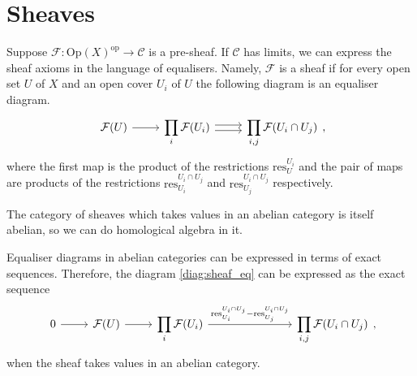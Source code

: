 \section{Sheaves}
\begin{cat}
  Suppose $\mathcal{F}: \text{Op}(X)^{\text{op}}\to\mathcal{C}$ is a pre-sheaf.
  If $\mathcal{C}$ has limits, we can express the sheaf axioms in the
  language of equalisers. Namely, $\mathcal{F}$ is a sheaf if for every
  open set $U$ of $X$ and an open cover $U_{i}$ of $U$ the following
  diagram is an equaliser diagram.
  \begin{equation}\label{diag:sheaf_eq}\begin{tikzcd}
      \mathcal{F}(U)\rar
      & \displaystyle\prod_{i}\mathcal{F}(U_{i})\rar[shift left]\rar[shift right]
      & \displaystyle\prod_{i,j}\mathcal{F}(U_{i}\cap U_{j})
    \end{tikzcd},\end{equation}
  where the first map is the product of the restrictions
  $\text{res}_{U}^{U_{i}}$ and the pair of maps are products of the
  restrictions $\text{res}_{U_{i}}^{U_{i}\cap U_{j}}$ and
  $\text{res}_{U_{j}}^{U_{i}\cap U_{j}}$ respectively.
\end{cat}

The category of sheaves which takes values in an abelian category is
itself abelian, so we can do homological algebra in it.
\begin{cat}
  Equaliser diagrams in abelian categories can be expressed in terms
  of exact sequences. Therefore, the diagram \eqref{diag:sheaf_eq}
  can be expressed as the exact sequence
  \begin{equation}\label{diag:sheaf_ex}\begin{tikzcd}
      0\rar & \mathcal{F}(U)\rar & \displaystyle\prod_{i}\mathcal{F}(U_{i})
      \rar{\text{res}_{U_{i}}^{U_{i}\cap U_{j}}-\text{res}_{U_{j}}^{U_{i}\cap U_{j}}}
      &[5em] \displaystyle\prod_{i,j}\mathcal{F}(U_{i}\cap U_{j})
    \end{tikzcd},\end{equation}
  when the sheaf takes values in an abelian category.
\end{cat}

